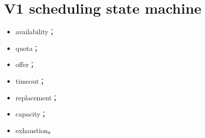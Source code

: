 \section{V1 scheduling state machine}

\begin{itemize}
  \item availability；
  \item quota；
  \item offer；
  \item timeout；
  \item replacement；
  \item capacity；
  \item exhaustion。
\end{itemize}
